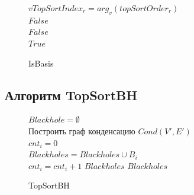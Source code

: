 \documentclass[12pt,a4paper,oneside,openany]{article}
\theoremstyle{definition}
\theoremstyle{lemma}
\theoremstyle{remark}
\begin{document}
\begin{figure}[H]
\begin{center}
\begin{algorithm}[H]
{{{                                }
                            }
			}
			 {
                             {
                                 {
                                    $vTopSortIndex_r = arg_v (topSortOrder_r)$ \\
                                     {
                                        \Return $False$ \\
                                    }
                                }
                            }
			}
                         {
                             {
                                \Return $False$ \\
                            }
                        }
                        \Return $True$
			\label{alg:isbasis}
			\caption{IsBasis}
		\end{algorithm}
	\end{center}
\end{figure}
\linespread{1.5}


\subsection{Алгоритм TopSortBH}\label{subsec:topsortbh}

\linespread{1.0}
\begin{figure}[H]
	\begin{center}
		\begin{algorithm}[H]
			\SetAlgoLined

                        $Blackhole = \emptyset$\\
                        Построить граф конденсацию $Cond(V',E')$ \\
                         {
                            $cnt_i = 0$ \\
                             {
                                 {
                                     {
                                        $Blackholes = Blackholes \cup B_i$ \\
                                        $cnt_i = cnt_i + 1$
                                    }
                                }
                            }
                             {
                                \Return $Blackholes$
                            }
                        }
                        \Return $Blackholes$
			\label{alg:topsort}
			\caption{TopSortBH}
		\end{algorithm}
	\end{center}
\end{figure}
\linespread{1.5}
\end{document}
